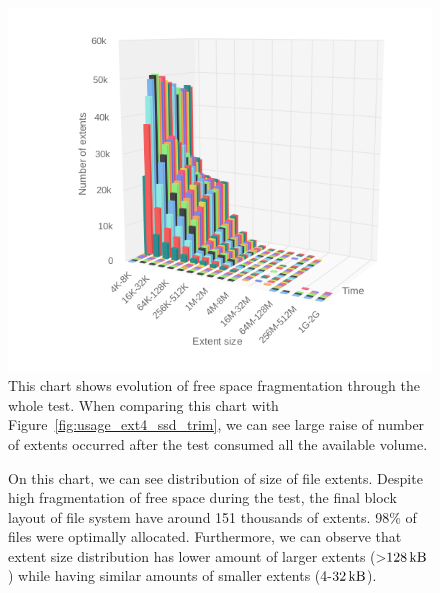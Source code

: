 \documentclass[
  color, %
  table, %
  lof,   %
  lot,   %
]{fithesis3}
\begin{document}
\begin{figure}[h]
    \centering
    \includegraphics[width=\textwidth,keepaspectratio]{../charts/SSD_ext4_trim/free.png}
    \caption[Evolution of free space fragmentation of ext4 during testing on SSD with regular trimming]{This chart shows evolution of free space fragmentation through the whole test. When comparing this chart with Figure~\ref{fig:usage_ext4_ssd_trim}, we can see large raise of number of extents occurred after the test consumed all the available volume.}
    \label{fig:free_ext4_ssd}
\end{figure}

\begin{figure}[h]
    \centering
    \caption[Size distribution of file extents of ext4 during testing on SSD with regular trimming]{On this chart, we can see distribution of size of file extents. Despite high fragmentation of free space during the test, the final block layout of file system have around 151 thousands of extents. 98\% of files were optimally allocated. Furthermore, we can observe that extent size distribution has lower amount of larger extents (>$\SI{128}{\kilo\byte}$) while having similar amounts of smaller extents (4-$\SI{32}{\kilo\byte}$).}
    \label{fig:used_ext4_ssd}
\end{figure}
\end{document}
